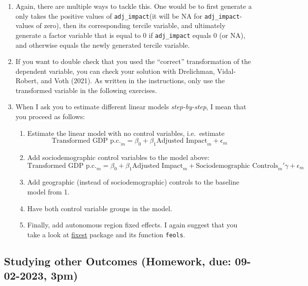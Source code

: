 \documentclass[
]{report}
\providecommand{\tightlist}{%
  \setlength{\itemsep}{0pt}\setlength{\parskip}{0pt}}\usepackage{longtable,booktabs,array}
\begin{document}
\begin{enumerate}
\def\labelenumi{\arabic{enumi}.}
\item
  Again, there are multiple ways to tackle this. One would be to first
  generate a only takes the positive values of \texttt{adj\_impact}(it
  will be NA for \texttt{adj\_impact}-values of zero), then its
  corresponding tercile variable, and ultimately generate a factor
  variable that is equal to 0 if \texttt{adj\_impact} equals 0 (or NA),
  and otherwise equals the newly generated tercile variable.
\item
  If you want to double check that you used the ``correct''
  transformation of the dependent variable, you can check your solution
  with Drelichman, Vidal-Robert, and Voth (2021). As written in the
  instructions, only use the transformed variable in the following
  exercises.
\item
  When I ask you to estimate different linear models
  \emph{step-by-step}, I mean that you proceed as follows:

  \begin{enumerate}
  \def\labelenumii{\arabic{enumii}.}
  \tightlist
  \item
    Estimate the linear model with no control variables, i.e.~estimate
    \[
     \text{Transformed GDP p.c.}_m = \beta_0 + \beta_1 \text{Adjusted Impact}_m + \epsilon_m 
     \]
  \item
    Add sociodemographic control variables to the model above: \[
     \text{Transformed GDP p.c.}_m = \beta_0 + \beta_1 \text{Adjusted Impact}_m + \text{Sociodemographic Controls}_m' \gamma +  \epsilon_m 
     \]
  \item
    Add geographic (instead of sociodemographic) controls to the
    baseline model from 1.
  \item
    Have both control variable groups in the model.
  \item
    Finally, add autonomous region fixed effects. I again suggest that
    you take a look at \href{https://lrberge.github.io/fixest/}{fixest}
    package and its function \texttt{feols}.
  \end{enumerate}
\end{enumerate}

\subsection{Studying other Outcomes (Homework, due: 09-02-2023, 3pm)}
\end{document}
